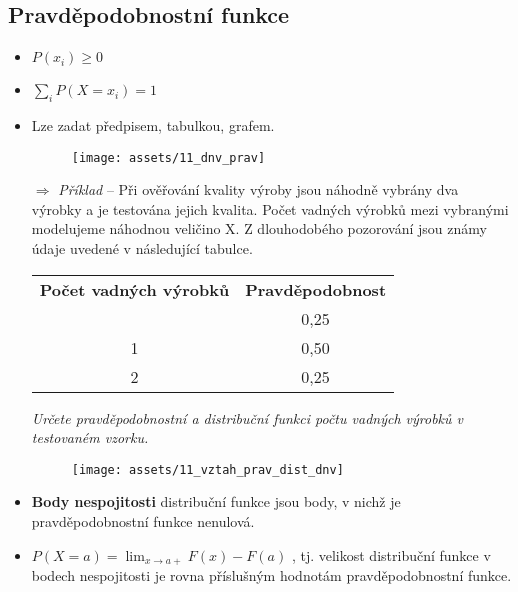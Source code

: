 \subsection{Pravděpodobnostní funkce}
\begin{itemize}
    \item $P(x_i) \geq 0$
    \item $\sum_i P(X = x_i) = 1$
    \item Lze zadat předpisem, tabulkou, grafem.
          \begin{figure}[H]
              \centering
              \texttt{[image: assets/11\_dnv\_prav]}
          \end{figure}
    \item[$\Rightarrow$] \textit{Příklad} -- Při ověřování kvality výroby jsou náhodně vybrány dva výrobky a je testována jejich kvalita. Počet vadných výrobků mezi vybranými modelujeme náhodnou veličino X. Z dlouhodobého pozorování jsou známy údaje uvedené v následující tabulce.
          \begin{table}[H]
              \centering
              \begin{tabular}{c|c}
                  \textbf{Počet vadných výrobků} & \textbf{Pravděpodobnost} \\\hhline
                  0                              & 0,25                     \\
                  1                              & 0,50                     \\
                  2                              & 0,25
              \end{tabular}
          \end{table}
          \textit{Určete pravděpodobnostní a distribuční funkci počtu vadných výrobků v testovaném vzorku.}
          \begin{figure}[H]
              \centering
              \texttt{[image: assets/11\_vztah\_prav\_dist\_dnv]}
          \end{figure}
    \item \textbf{Body nespojitosti} distribuční funkce jsou body, v nichž je pravděpodobnostní funkce nenulová.
    \item $P (X= a) = \lim_{x\to a+} F(x) - F(a)$ , tj. velikost  distribuční funkce v bodech nespojitosti je rovna příslušným hodnotám pravděpodobnostní funkce.
\end{itemize}
